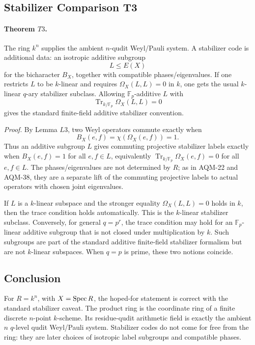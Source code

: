 \subsection{Stabilizer Comparison T3}

\paragraph{Theorem \(T3\).}
The ring \(k^n\) supplies the ambient \(n\)-qudit Weyl/Pauli system.  A
stabilizer code is additional data: an isotropic additive subgroup
\[
  L\leq E(X)
\]
for the bicharacter \(B_X\), together with compatible phases/eigenvalues.  If
one restricts \(L\) to be \(k\)-linear and requires \(\Omega_X(L,L)=0\) in
\(k\), one gets the usual \(k\)-linear \(q\)-ary stabilizer subclass.  Allowing
\(\mathbb F_p\)-additive \(L\) with
\[
  \operatorname{Tr}_{k/\mathbb F_p}\Omega_X(L,L)=0
\]
gives the standard finite-field additive stabilizer convention.

\emph{Proof.}
By Lemma \(L3\), two Weyl operators commute exactly when
\[
  B_X(e,f)=\chi(\Omega_X(e,f))=1.
\]
Thus an additive subgroup \(L\) gives commuting projective stabilizer labels
exactly when \(B_X(e,f)=1\) for all \(e,f\in L\), equivalently
\(\operatorname{Tr}_{k/\mathbb F_p}\Omega_X(e,f)=0\) for all \(e,f\in L\).
The phases/eigenvalues are not determined by \(R\); as in AQM-22 and AQM-38,
they are a separate lift of the commuting projective labels to actual
operators with chosen joint eigenvalues.

If \(L\) is a \(k\)-linear subspace and the stronger equality
\(\Omega_X(L,L)=0\) holds in \(k\), then the trace condition holds
automatically.  This is the \(k\)-linear stabilizer subclass.  Conversely, for
general \(q=p^r\), the trace condition may hold for an \(\mathbb F_p\)-linear
additive subgroup that is not closed under multiplication by \(k\).  Such
subgroups are part of the standard additive finite-field stabilizer formalism
but are not \(k\)-linear subspaces.  When \(q=p\) is prime, these two notions
coincide.

\subsection{Conclusion}

For \(R=k^n\), with \(X=\operatorname{Spec} R\), the hoped-for statement is correct with the
standard stabilizer caveat.  The product ring is the coordinate ring of a
finite discrete \(n\)-point \(k\)-scheme.  Its residue-qudit arithmetic field
is exactly the ambient \(n\) \(q\)-level qudit Weyl/Pauli system.  Stabilizer
codes do not come for free from the ring: they are later choices of isotropic
label subgroups and compatible phases.
